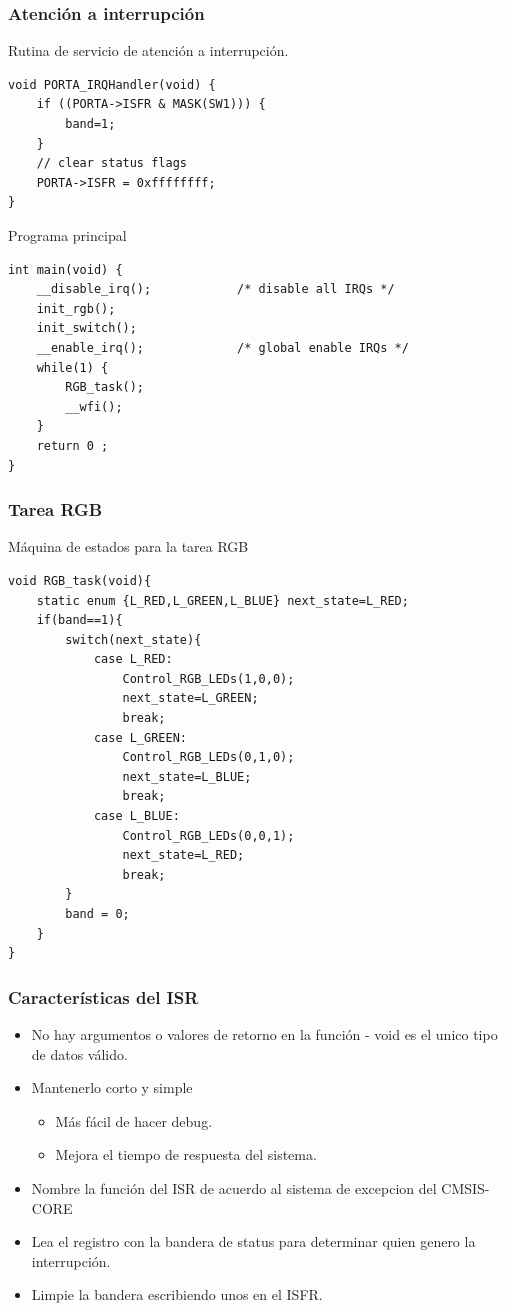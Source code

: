 \documentclass[10.5pt,scale=1.0,t,aspectratio=169,hyperref={pdfpagelabels=false}]{beamer}
\begin{document}
\begin{frame}[fragile]
	\frametitle{Atención a interrupción}
	Rutina de servicio de atención a interrupción. 
	\begin{lstlisting}[style=CStyle]
void PORTA_IRQHandler(void) {
	if ((PORTA->ISFR & MASK(SW1))) {
		band=1;
	}
	// clear status flags
	PORTA->ISFR = 0xffffffff;
}
	\end{lstlisting}

Programa principal
\begin{lstlisting}[style=CStyle]
int main(void) {
	__disable_irq();            /* disable all IRQs */
	init_rgb();
	init_switch();
	__enable_irq();             /* global enable IRQs */
	while(1) {
		RGB_task();
		__wfi();
	}
	return 0 ;
}
\end{lstlisting}
\end{frame}
\begin{frame}[fragile]
	\frametitle{Tarea RGB}
	Máquina de estados para la tarea RGB
	\begin{lstlisting}[style=CStyle]
void RGB_task(void){
	static enum {L_RED,L_GREEN,L_BLUE} next_state=L_RED;
	if(band==1){
		switch(next_state){
			case L_RED:
				Control_RGB_LEDs(1,0,0);
				next_state=L_GREEN;
				break;
			case L_GREEN:
				Control_RGB_LEDs(0,1,0);
				next_state=L_BLUE;
				break;
			case L_BLUE:
				Control_RGB_LEDs(0,0,1);
				next_state=L_RED;
				break;
		}
		band = 0;
	}
}
	\end{lstlisting}
\end{frame}
\begin{frame}
	\frametitle{Características del ISR}
	\begin{itemize}
		\item No hay argumentos o valores de retorno en la función - void es el unico tipo de datos válido.
		\item Mantenerlo corto y simple
		\begin{itemize}
			\item Más fácil de hacer debug.
			\item Mejora el tiempo de respuesta del sistema.
		\end{itemize}
		\item Nombre la función del ISR de acuerdo al sistema de excepcion del CMSIS-CORE 
		\item Lea el registro con la bandera de status para determinar quien genero la interrupción.
		\item Limpie la bandera escribiendo unos en el ISFR. 
	\end{itemize}
\end{frame}
\end{document}
